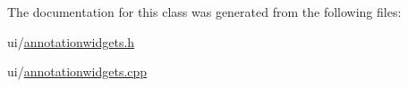 The documentation for this class was generated from the following files\+:\begin{DoxyCompactItemize}
\item 
ui/\hyperlink{annotationwidgets_8h}{annotationwidgets.\+h}\item 
ui/\hyperlink{annotationwidgets_8cpp}{annotationwidgets.\+cpp}\end{DoxyCompactItemize}
